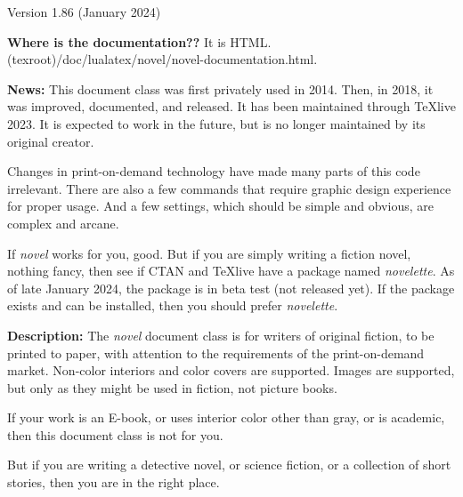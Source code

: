\documentclass{novel} %
\begin{document}
\thispagestyle{empty}
\begin{ChapterStart}[8]
\vspace{\nbs} %
\vspace{\nbs}
{\centering Version 1.86 (January 2024)\par}
\end{ChapterStart}

\textbf{Where is the documentation??} It is HTML.\\
(texroot)/doc/lualatex/novel/novel-documentation.html.

\scenebreak

\textbf{News:} This document class was first privately used in 2014.
Then, in 2018, it was improved, documented, and released. It has been
maintained through TeXlive 2023. It is expected to work in the future, but is
no longer maintained by its original creator.\par
Changes in print-on-demand technology have made many parts of this code
irrelevant. There are also a few commands that require graphic design
experience for proper usage. And a few settings, which should be simple and
obvious, are complex and arcane.\par
If \emph{novel} works for you, good. But if you are simply writing a fiction
novel, nothing fancy, then see if CTAN and TeXlive have a package named
\emph{novelette}. As of late January 2024, the package is in beta test
(not released yet). If the package exists and can be installed, then you
should prefer \emph{novelette}. 

\scenebreak

\textbf{Description:} The \emph{novel} document class is for writers of
original fiction, to be printed to paper, with attention to the requirements
of the print-on-demand market. Non-color interiors and color covers are
supported. Images are supported, but only as they might be used in fiction,
not picture books.

If your work is an E-book, or uses interior color other than gray, or is
academic, then this document class is not for you. 

But if you are writing a detective novel, or science fiction, or a collection
of short stories, then you are in the right place.

\makeatletter\nocle@rtoendtrue\makeatother %
\end{document}

